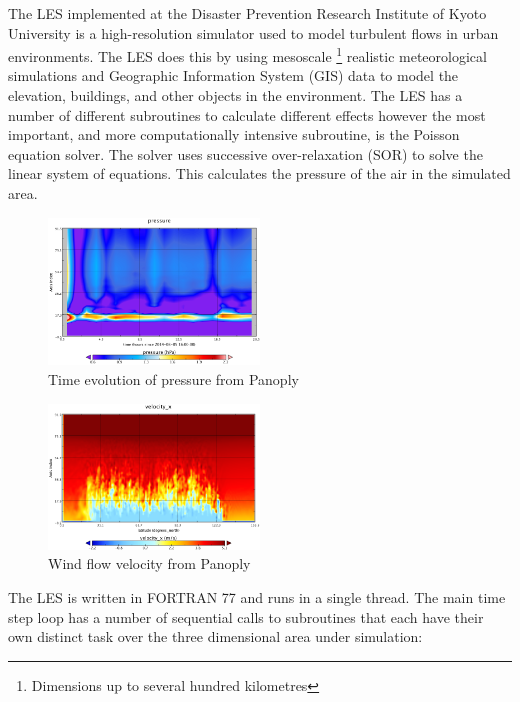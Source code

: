 The LES implemented at the Disaster Prevention Research Institute of Kyoto
University is a high-resolution simulator used to model turbulent flows in urban
environments. The LES does this by using mesoscale \footnote{Dimensions up to
several hundred kilometres} realistic meteorological simulations and Geographic
Information System (GIS) data to model the elevation, buildings, and other
objects in the environment. The LES has a number of different subroutines to
calculate different effects however the most important, and more computationally
intensive subroutine, is the Poisson equation solver. The solver uses successive
over-relaxation (SOR) to solve the linear system of equations. This calculates
the pressure of the air in the simulated area.

\begin{figure}
    \includegraphics[width=0.5\textwidth]{graphs/pressure_in_LES_output_p.png}
    \caption{Time evolution of pressure from Panoply}
    \label{fig:lespressure}
\end{figure}

\begin{figure}
    \includegraphics[width=0.5\textwidth]{graphs/velocity_x_in_LES_output_u.png}
    \caption{Wind flow velocity from Panoply}
    \label{fig:lesvelocity}
\end{figure}

The LES is written in FORTRAN 77 and runs in a single thread. The main time step
loop has a number of sequential calls to subroutines that each have their own
distinct task over the three dimensional area under simulation:

